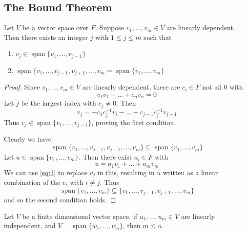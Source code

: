 \documentclass{article}
\DeclareMathOperator{\spn}{span}
\begin{document}
\subsection{The Bound Theorem}
\begin{theorem}
  Let $V$ be a vector space over $F$. Suppose $v_1, \ldots, v_m \in V$ are linearly dependent. Then there exists an integer $j$ with $1 \leq j \leq m$ such that
  \begin{enumerate}
    \item $v_j \in \spn\{v_1, \ldots, v_{j-1}\}$
    \item $\spn\{v_1, \ldots, v_{j-1}, v_{j+1}, \ldots, v_m = \spn\{v_1, \ldots, v_m\}$
    \end{enumerate}
  \end{theorem}
  \begin{proof}
    Since $v_1, \ldots, v_m \in V$ are linearly dependent, there are $c_i \in F$ not all $0$ with
    \[
      c_1v_1 + \dots + c_nv_n = 0
    \]
    Let $j$ be the largest index with $c_j \neq 0$. Then
    \begin{equation}\label{eq:1}
      v_j = -c_1c_j^{-1}v_i - \dots - c_{j-1}c_{j}^{-1}v_{j-1}
    \end{equation}
    Thus $v_j \in \spn\{v_1, \ldots, v_{j-1}\}$, proving the first condition.

    Clearly we have \[
      \spn\{v_1, \ldots, v_{j-1}, v_{j+1}, \ldots, v_m\} \subseteq \spn\{v_1, \ldots, v_m\}
    \]
    Let $u \in \spn\{v_1, \ldots, v_m\}$. Then there exist $a_i \in F$ with
    \[
      u = a_1v_1 + \dots + a_mv_m
    \]
    We can use \eqref{eq:1} to replace $v_j$ in this, resulting in $u$ written as a linear combination of the $v_i$ with $i \neq j$. Thus
    \[
      \spn\{v_1, \ldots, v_m\} \subseteq \{v_1, \ldots, v_{j-1}, v_{j+1}, \ldots, v_m\}
    \]
    and so the second condition holds.
  \end{proof}
  \begin{theorem}
    Let $V$ be a finite dimensional vector space, if $u_1, \ldots, u_m \in V$ are linearly independent, and $V = \spn\{w_1, \ldots, w_n\}$, then $m \leq n$.
  \end{theorem}
\end{document}
